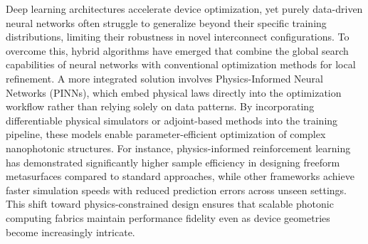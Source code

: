 \documentclass[11pt]{article}
\begin{document}
Deep learning architectures accelerate device optimization, yet purely data-driven neural networks often struggle to generalize beyond their specific training distributions, limiting their robustness in novel interconnect configurations. To overcome this, hybrid algorithms have emerged that combine the global search capabilities of neural networks with conventional optimization methods for local refinement. A more integrated solution involves Physics-Informed Neural Networks (PINNs), which embed physical laws directly into the optimization workflow rather than relying solely on data patterns. \citep{doi_10_1038_s41467_025_64624_3_42144da5} \citep{doi_10_3390_s25196242_b7203a7f} By incorporating differentiable physical simulators or adjoint-based methods into the training pipeline, these models enable parameter-efficient optimization of complex nanophotonic structures. For instance, physics-informed reinforcement learning has demonstrated significantly higher sample efficiency in designing freeform metasurfaces compared to standard approaches, while other frameworks achieve faster simulation speeds with reduced prediction errors across unseen settings. This shift toward physics-constrained design ensures that scalable photonic computing fabrics maintain performance fidelity even as device geometries become increasingly intricate. \citep{doi_10_1021_acsphotonics_2c00968_06a2e96b} \citep{s2_037e66f37189104d61c0d000de0cee202b7eec9e_d15b8018} \citep{doi_10_1515_nanoph_2023_0852_cb27a26f} \citep{doi_10_48550_arxiv_2209_10098_b3bedb78}
\end{document}
